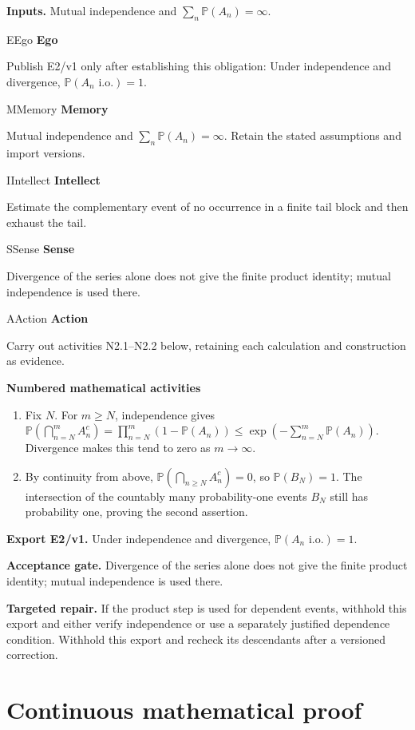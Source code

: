 \documentclass[preprint,12pt,aps,pra,showkeys,amsmath,amssymb,superscriptaddress,floatfix]{revtex4-2}
\theoremstyle{definition}
\theoremstyle{remark}
\newcommand{\mmfaculty}[3]{%
 \begin{mmfacultybox}{#1}{#2}
 {\sffamily\bfseries\color{MMBlue}#2}\par\smallskip #3
 \end{mmfacultybox}}
\newcommand{\field}[2]{\par\smallskip\noindent\textbf{#1.} #2\par}
\begin{document}
\field{Inputs}{Mutual independence and \(\sum_n\mathbb P(A_n)=\infty\).}

\mmfaculty{E}{Ego}{Publish E2/v1 only after establishing this obligation: Under
independence and divergence, \(\mathbb P(A_n\text{ i.o.})=1\).}

\mmfaculty{M}{Memory}{Mutual independence and \(\sum_n\mathbb P(A_n)=\infty\). Retain the
stated assumptions and import versions.}

\mmfaculty{I}{Intellect}{Estimate the complementary event of no occurrence in a finite tail block
and then exhaust the tail.}

\mmfaculty{S}{Sense}{Divergence of the series alone does not give the finite product
identity; mutual independence is used there.}

\mmfaculty{A}{Action}{Carry out activities N2.1--N2.2 below, retaining each calculation and
construction as evidence.}

\smallskip\noindent\textbf{Numbered mathematical activities}

\begin{enumerate}[label=N2.\arabic*,leftmargin=3.4em]

\item Fix \(N\). For \(m\ge N\), independence gives
\(\mathbb P(\bigcap_{n=N}^m A_n^c)=\prod_{n=N}^m(1-\mathbb P(A_n))\le\exp(-\sum_{n=N}^m\mathbb P(A_n))\).
Divergence makes this tend to zero as \(m\to\infty\).

\item By continuity from above, \(\mathbb P(\bigcap_{n\ge N}A_n^c)=0\), so
\(\mathbb P(B_N)=1\). The intersection of the countably many
probability-one events \(B_N\) still has probability one, proving the
second assertion.

\end{enumerate}

\field{Export E2/v1}{Under independence and divergence, \(\mathbb P(A_n\text{ i.o.})=1\).}

\field{Acceptance gate}{Divergence of the series alone does not give the finite product
identity; mutual independence is used there.}

\field{Targeted repair}{If the product step is used for dependent events, withhold this export
and either verify independence or use a separately justified dependence
condition. Withhold this export and recheck its descendants after a
versioned correction.}

\endgroup\clearpage\section{Continuous mathematical proof}\label{sec:proof}
\end{document}
